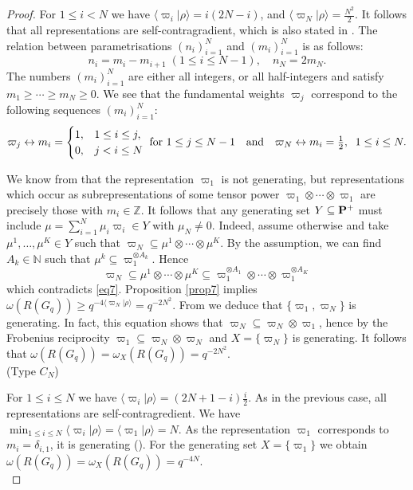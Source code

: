 \documentclass[11 pt, leqno]{amsart}
\newcommand{\la}{\langle}
\newcommand{\ra}{\rangle}
\newcommand{\NN}{\mathbb{N}}
\newcommand{\ZZ}{\mathbb{Z}}
\theoremstyle{definition}
\numberwithin{equation}{section}
\begin{document}
\begin{proof}
For $1\le i < N$ we have $\la \varpi_i |\rho\ra =i(2N-i)$, and $\la\varpi_N|\rho\ra = \tfrac{N^2}{2}$.  It follows that all representations are self-contragradient, which is also stated in \cite[Page 268]{BourbakiLie4-6}. The relation between parametrisations $(n_i)_{i=1}^{N}$ and $(m_i)_{i=1}^{N}$ is as follows:
\[
n_i=m_i-m_{i+1}\;(1\le i \le N-1),\quad
n_N=2m_N.
\]
The numbers $(m_i)_{i=1}^{N}$ are either all integers, or all half-integers and satisfy $m_1\ge \cdots \ge m_N\ge 0$. We see that the fundamental weights $\varpi_j$ correspond to the following sequences $(m_i)_{i=1}^{N}$:
\begin{equation}\label{eq7}
\varpi_j\leftrightarrow m_i=\begin{cases}
1, & 1 \le i \le j,\\
0, & j<i\le N
\end{cases} \textnormal{ for }1\le j \le N-1 \quad \textnormal{and}\quad 
\varpi_N\leftrightarrow m_i=\tfrac{1}{2},\;\; 1 \le i \le N .
\end{equation}

We know from \cite[Proposition 20, page 211]{KlimykSchmudgen} that the representation $\varpi_1$ is not generating, but representations which occur as subrepresentations of some tensor power $\varpi_1 \otimes \cdots\otimes \varpi_1$ are precisely those with $m_i\in \ZZ$. It follows that any generating set $Y\subseteq \bf{P}^+$ must include $\mu=\sum_{i=1}^{N}\mu_i \varpi_i\in Y$ with $\mu_N\neq 0$. Indeed, assume otherwise and take $\mu^1,\dotsc,\mu^K\in Y$ such that $\varpi_N\subseteq \mu^1\otimes \cdots\otimes \mu^K$. By the assumption, we can find $A_k\in \NN$ such that $\mu^k\subseteq \varpi_1^{\otimes A_k}$. Hence
\[
\varpi_N\subseteq \mu^1\otimes \cdots \otimes \mu^K\subseteq \varpi_1^{\otimes A_1}\otimes\cdots \otimes\varpi_1^{\otimes A_K}
\]
which contradicts \eqref{eq7}. Proposition \ref{prop7} implies $\omega(R(G_q))\ge q^{-4 \la \varpi_N|\rho\ra }=q^{-2N^2}$. From \cite[equation (15), page 210]{KlimykSchmudgen} we deduce that $\{\varpi_1,\varpi_N\}$ is generating. In fact, this equation shows that $\varpi_N\subseteq \varpi_N\otimes \varpi_1$, hence by the Frobenius reciprocity $\varpi_1\subseteq \varpi_N\otimes \varpi_N$ and $X=\{\varpi_N\}$ is generating. It follows that $\omega(R(G_q))=\omega_{X}(R(G_q))=q^{-2N^2}$.\\

(Type $C_N$) 

For $1\le i \le N$ we have $\la \varpi_i |\rho\ra =(2N+1-i)\tfrac{i}{2}$. As in the previous case, all representations are self-contragredient. We have $\min_{1\le i \le N}\la \varpi_i|\rho\ra = \la \varpi_1|\rho\ra =N$. As the representation $\varpi_1$ corresponds to $m_i=\delta_{i,1}$, it is generating (\cite[Proposition 20, page 201]{KlimykSchmudgen}). For the generating set $X=\{\varpi_1\}$ we obtain $\omega(R(G_q))=\omega_X(R(G_q))=q^{-4N}$.\\


\end{proof}
\end{document}
